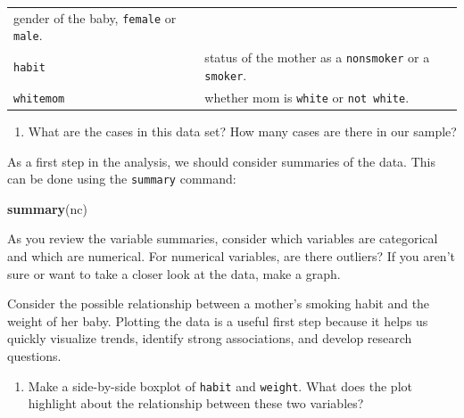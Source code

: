 \documentclass[]{book}
\newenvironment{Shaded}{\begin{snugshade}}{\end{snugshade}}
\newcommand{\KeywordTok}[1]{\textcolor[rgb]{0.13,0.29,0.53}{\textbf{{#1}}}}
\newcommand{\NormalTok}[1]{{#1}}
\providecommand{\tightlist}{%
  \setlength{\itemsep}{0pt}\setlength{\parskip}{0pt}}
\theoremstyle{definition}
\theoremstyle{definition}
\theoremstyle{remark}
\begin{document}
\begin{longtable}[]{@{}ll@{}}
\begin{minipage}[t]{0.16\columnwidth}
gender of the baby, \texttt{female} or \texttt{male}.\strut
\end{minipage}\tabularnewline
\begin{minipage}[t]{0.22\columnwidth}\raggedright\strut
\texttt{habit}\strut
\end{minipage} & \begin{minipage}[t]{0.16\columnwidth}\raggedright\strut
status of the mother as a \texttt{nonsmoker} or a \texttt{smoker}.\strut
\end{minipage}\tabularnewline
\begin{minipage}[t]{0.22\columnwidth}\raggedright\strut
\texttt{whitemom}\strut
\end{minipage} & \begin{minipage}[t]{0.16\columnwidth}\raggedright\strut
whether mom is \texttt{white} or \texttt{not\ white}.\strut
\end{minipage}\tabularnewline
\bottomrule
\end{longtable}

\begin{enumerate}
\def\labelenumi{\arabic{enumi}.}
\tightlist
\item
  What are the cases in this data set? How many cases are there in our
  sample?
\end{enumerate}

As a first step in the analysis, we should consider summaries of the
data. This can be done using the \texttt{summary} command:

\begin{Shaded}
\begin{Highlighting}[]
\KeywordTok{summary}\NormalTok{(nc)}
\end{Highlighting}
\end{Shaded}

As you review the variable summaries, consider which variables are
categorical and which are numerical. For numerical variables, are there
outliers? If you aren't sure or want to take a closer look at the data,
make a graph.

Consider the possible relationship between a mother's smoking habit and
the weight of her baby. Plotting the data is a useful first step because
it helps us quickly visualize trends, identify strong associations, and
develop research questions.

\begin{enumerate}
\def\labelenumi{\arabic{enumi}.}
\setcounter{enumi}{1}
\tightlist
\item
  Make a side-by-side boxplot of \texttt{habit} and \texttt{weight}.
  What does the plot highlight about the relationship between these two
  variables?
\end{enumerate}
\end{document}
